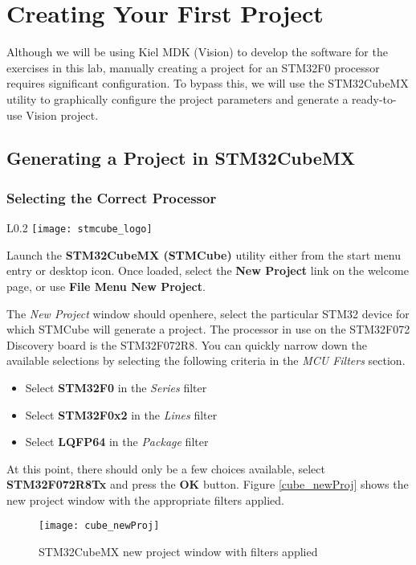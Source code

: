 \documentclass[11pt,fleqn]{book} %
\begin{document}
\section{Creating Your First Project}
Although we will be using Kiel MDK ({\textmu}Vision) to develop the software for the exercises in this lab, manually creating a project for an STM32F0 processor requires significant configuration. To bypass this, we will use the STM32CubeMX utility to graphically configure the project parameters and generate a ready-to-use {\textmu}Vision project. 

\subsection{Generating a Project in STM32CubeMX}
\subsubsection*{Selecting the Correct Processor}
\begin{wrapfigure}{L}{0.2\textwidth}
	\centering\texttt{[image: stmcube\_logo]}
\end{wrapfigure}

Launch the \textbf{STM32CubeMX (STMCube)} utility either from the start menu entry or desktop icon. Once loaded, select the \textbf{New Project} link on the welcome page, or use \textbf{File Menu \textrightarrow New Project}.

\noindent
The \textit{New Project} window should open\textemdash here, select the particular STM32 device for which STMCube will generate a project. The processor in use on the STM32F072 Discovery board is the STM32F072R8. You can quickly narrow down the available selections by selecting the following criteria in the \textit{MCU Filters} section.
\begin{itemize}
	\item Select \textbf{STM32F0} in the \textit{Series} filter
	\item Select \textbf{STM32F0x2} in the \textit{Lines} filter
	\item Select \textbf{LQFP64} in the \textit{Package} filter
\end{itemize}
At this point, there should only be a few choices available, select \textbf{STM32F072R8Tx} and press the \textbf{OK} button. Figure \vref{cube_newProj} shows the new project window with the appropriate filters applied.

\begin{figure}[h]
	\centering\texttt{[image: cube\_newProj]}
	\caption{STM32CubeMX new project window with filters applied}
	\label{cube_newProj}
\end{figure}
\end{document}
